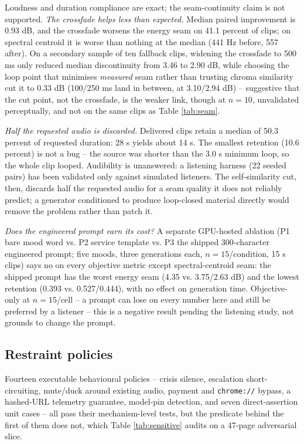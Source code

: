 \documentclass[conference]{IEEEtran}
\begin{document}
Loudness and duration compliance are exact; the seam-continuity claim is
not supported. \emph{The crossfade helps less than expected.} Median
paired improvement is 0.93 dB, and the crossfade worsens the energy seam
on 41.1 percent of clips; on spectral centroid it is worse than nothing
at the median (441 Hz before, 557 after). On a secondary sample of ten
fallback clips, widening the crossfade to 500 ms only reduced median
discontinuity from 3.46 to 2.90 dB, while choosing the loop point that
minimises \emph{measured} seam rather than trusting chroma similarity cut
it to 0.33 dB (100/250 ms land in between, at 3.10/2.94 dB) --
suggestive that the cut point, not the crossfade, is the weaker link,
though at $n=10$, unvalidated perceptually, and not on the same clips as
Table \ref{tab:seam}.

\emph{Half the requested audio is discarded.} Delivered clips retain a
median of 50.3 percent of requested duration: 28 s yields about 14 s. The
smallest retention (10.6 percent) is not a bug -- the source was shorter
than the 3.0 s minimum loop, so the whole clip looped. Audibility is
unanswered: a listening harness (22 seeded pairs) has been validated only
against simulated listeners. The self-similarity cut, then, discards half
the requested audio for a seam quality it does not reliably predict; a
generator conditioned to produce loop-closed material directly would
remove the problem rather than patch it.

\emph{Does the engineered prompt earn its cost?} A separate GPU-hosted
ablation (P1 bare mood word vs. P2 service template vs. P3 the shipped
300-character engineered prompt; five moods, three generations each,
$n=15$/condition, 15 s clips) says no on every objective metric except
spectral-centroid seam: the shipped prompt has the worst energy seam
(4.35 vs. 3.75/2.63 dB) and the lowest retention (0.393 vs. 0.527/0.444),
with no effect on generation time. Objective-only at $n=15$/cell -- a
prompt can lose on every number here and still be preferred by a
listener -- this is a negative result pending the listening study, not
grounds to change the prompt.

\subsection{Restraint policies}
\label{sec:res-audit}

Fourteen executable behavioural policies -- crisis silence, escalation
short-circuiting, mute/duck around existing audio, payment and
\texttt{chrome://} bypass, a hashed-URL telemetry guarantee, model-pin
detection, and seven direct-assertion unit cases -- all pass their
mechanism-level tests, but the predicate behind the first of them does
not, which Table \ref{tab:sensitive} audits on a 47-page adversarial
slice.
\end{document}
